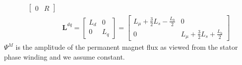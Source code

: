 \documentclass[11pt,a4paper,oneside]{book}
\numberwithin{equation}{section}
\theoremstyle{it}
\theoremstyle{definition}
\begin{document}
\begin{mybox}
\begin{equation*}
\begin{aligned}
\begin{bmatrix}
				0 & R
			\end{bmatrix} \\[6pt]
			& \mathbf{L}^{dq} = 
			\begin{bmatrix} L_d &  0 \\
				0 & L_q
			\end{bmatrix} =
			\begin{bmatrix} L_\mu+\frac{3}{2}L_s-\frac{L_b}{2} &  0 \\
				0 & L_\mu+\frac{3}{2}L_s+\frac{L_b}{2}
			\end{bmatrix}
		\end{aligned} 
	\end{equation*}
	$\Psi^M$ is the amplitude of the permanent magnet flux as viewed from 
	the stator phase winding and we assume constant.
\end{mybox}
\end{document}
